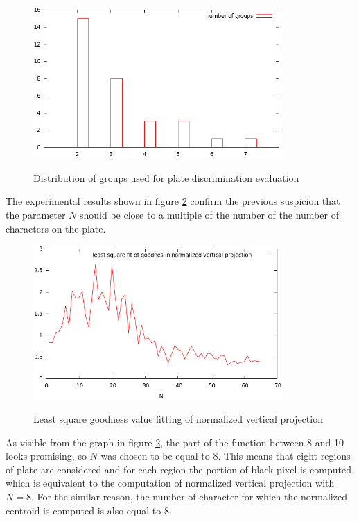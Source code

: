\documentclass[times, utf8, zavrsni]{fer}
\begin{document}
\begin{figure}[htb]
\centering
\includegraphics[width=0.85\textwidth]{images/plate-group-distribution}
\label{fig:plate-group-distribution}
\caption{Distribution of groups used for plate discrimination evaluation}
\end{figure}

The experimental results shown in figure \ref{fig:ver-proj-lsf} confirm
the previous suspicion that the parameter $N$ should be close to a multiple of
the number of the number of characters on the plate.

\begin{figure}[htb]
\caption{Least square goodness value fitting of normalized vertical projection}
\centering
\includegraphics[width=0.85\textwidth]{images/ver-proj-lsf}
\label{fig:ver-proj-lsf}
\end{figure}

As visible from the graph in figure \ref{fig:ver-proj-lsf}, the part of the
function between 8 and 10 looks promising, so $N$ was chosen to be equal to 8.
This means that eight regions of plate are considered and for each region the
portion of black pixel is computed, which is equivalent to the computation of
normalized vertical projection with $N = 8$. For the similar reason, the number
of character for which the normalized centroid is computed is also equal to 8.  
\end{document}
